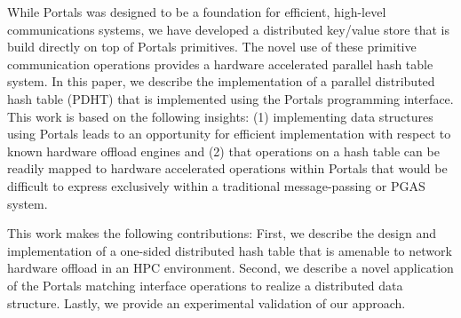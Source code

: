 While Portals was designed to be a foundation for efficient,
high-level communications systems, we have developed a distributed
key/value store that is build directly on top of Portals
primitives. The novel use of these primitive communication operations
provides a hardware accelerated parallel hash table system. In this
paper, we describe the implementation of a parallel distributed hash
table (PDHT) that is implemented using the Portals programming
interface. This work is based on the following insights: (1)
implementing data structures using Portals leads to an opportunity for
efficient implementation with respect to known hardware offload
engines and (2) that operations on a hash table can be readily mapped
to hardware accelerated operations within Portals that would be
difficult to express exclusively within a traditional message-passing
or PGAS system.

This work makes the following contributions: First, we describe the
design and implementation of a one-sided distributed hash table that
is amenable to network hardware offload in an HPC environment. Second,
we describe a novel application of the Portals matching interface
operations to realize a distributed data structure. Lastly, we provide
an experimental validation of our approach.


